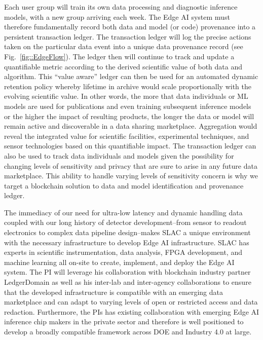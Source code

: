 \documentclass{article}
\begin{document}
Each user group will train its own data processing and diagnostic inference models, with a new group arriving each week.
The Edge AI system must therefore fundamentally record both data and model (or code) provenance into a persistent transaction ledger.
The transaction ledger will log the precise actions taken on the particular data event into a unique data provenance record (see Fig.~\ref{fig::EdgeFlow}).
The ledger then will continue to track and update a quantifiable metric according to the derived scientific value of both data and algorithm.
This ``value aware'' ledger can then be used for an automated dynamic retention policy whereby lifetime in archive would scale proportionally with the evolving scientific value.
In other words, the more that data individuals or ML models are used for publications and even training subsequent inference models or the higher the impact of resulting products, the longer the data or model will remain active and discoverable in a data sharing marketplace. 
Aggregation would reveal the integrated value for scientific facilities, experimental techniques, and sensor technologies based on this quantifiable impact.
The transaction ledger can also be used to track data individuals and models given the possibility for changing levels of sensitivity and privacy that are sure to arise in any future data marketplace. 
This ability to handle varying levels of sensitivity concern is why we target a blockchain solution to data and model identification and provenance ledger.

The immediacy of our need for ultra-low latency and dynamic handling data coupled with our long history of detector development--from sensor to readout electronics to complex data pipeline design--makes SLAC a unique environment with the necessary infrastructure to develop Edge AI infrastructure.
SLAC has experts in scientific instrumentation, data analysis, FPGA development, and machine learning all on-site to create, implement, and deploy the Edge AI system.
The PI will leverage his collaboration with blockchain industry partner LedgerDomain \cite{LedgerDomain,BruinChain} as well as his inter-lab and inter-agency collaborations to ensure that the developed infrastructure is compatible with an emerging data marketplace and can adapt to varying levels of open or restricted access and data redaction.
Furthermore, the PIs has existing collaboration with emerging Edge AI inference chip makers in the private sector and therefore is well positioned to develop a broadly compatible framework across DOE and Industry 4.0 at large.
\end{document}
